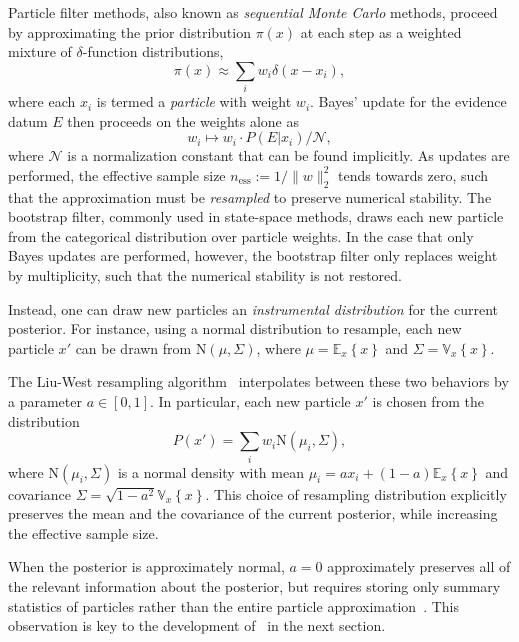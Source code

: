 \documentclass[twoside]{article}
\newcommand{\expect}[2]{{\mathbb{E}_{#2}}\!\left\{#1 \right\}}
\newcommand{\var}[2]{{\mathbb{V}_{#2}}\!\left\{#1 \right\}}
\newcommand{\CRej}{\text{rejection filtering}}
\newcommand{\ess}{\mathrm{ess}}
\newcommand{\NN}{\mathrm{N}}
\newcommand{\defeq}{\mathrel{:=}}
\begin{document}
Particle filter methods, also known as \emph{sequential Monte Carlo} methods, proceed
by approximating the prior distribution $\pi(x)$ at each step as a weighted
mixture of $\delta$-function distributions,
\begin{equation}
    \pi(x) \approx \sum_i w_i \delta(x - x_i),
\end{equation}
where each $x_i$ is termed a \emph{particle} with weight $w_i$.
Bayes' update for the evidence datum $E$ then proceeds on the weights alone as
\begin{equation}
    w_i \mapsto w_i \cdot P(E | x_i) / \mathcal{N},
\end{equation}
where $\mathcal{N}$ is a normalization constant that can be found implicitly.
As updates are performed, the effective sample size $n_\ess \defeq
1 / \|w\|_2^2$ tends towards zero, such that the approximation must be
\emph{resampled} to preserve numerical stability. The bootstrap filter,
commonly used in state-space methods, draws each new particle from the categorical
distribution over particle weights. In the case that only Bayes updates are
performed, however, the bootstrap filter only replaces weight by multiplicity,
such that the numerical stability is not restored.

Instead, one can draw new particles an \emph{instrumental distribution} for
the current posterior. For instance, using a normal distribution to resample,
each new particle $x'$ can be drawn from $\NN(\mu, \Sigma)$, where
$\mu = \expect{x}{x}$ and $\Sigma = \var{x}{x}$.

The Liu-West resampling algorithm~\cite{liu2001combined} interpolates between these two
behaviors by a parameter $a \in [0, 1]$. In particular, each new particle
$x'$ is chosen from the distribution
\begin{equation}
  \label{eq:liu-west}
  P(x') = \sum_i w_i \NN(\mu_i, \Sigma),
\end{equation}
where $\NN(\mu_i, \Sigma)$ is a normal density with mean
$\mu_i = a x_i + (1 - a) \expect xx$
and covariance $\Sigma = \sqrt{1 - a^2} \var{x}{x}$.
This choice of resampling distribution explicitly preserves the mean
and the covariance of the current posterior, while increasing the
effective sample size.

When the posterior is approximately normal, $a = 0$ approximately
preserves all of the relevant information about the posterior, but requires
storing only summary statistics of particles rather than the entire particle
approximation~\cite{sisson_sequential_2007,del2012adaptive}.   This observation is key to
the development of \CRej~in the next section.
\end{document}
